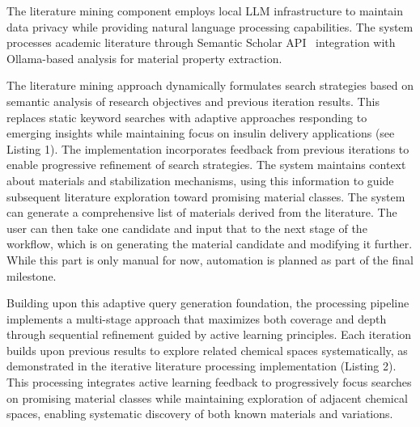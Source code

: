 \documentclass[]{fairmeta}
\begin{document}
The literature mining component employs local LLM infrastructure to maintain data privacy while providing natural language processing capabilities. The system processes academic literature through Semantic Scholar API~\cite{lo2020s2orc} integration with Ollama-based analysis for material property extraction.

The literature mining approach dynamically formulates search strategies based on semantic analysis of research objectives and previous iteration results. This replaces static keyword searches with adaptive approaches responding to emerging insights while maintaining focus on insulin delivery applications (see Listing 1). The implementation incorporates feedback from previous iterations to enable progressive refinement of search strategies. The system maintains context about materials and stabilization mechanisms, using this information to guide subsequent literature exploration toward promising material classes. The system can generate a comprehensive list of materials derived from the literature. The user can then take one candidate and input that to the next stage of the workflow, which is on generating the material candidate and modifying it further. While this part is only manual for now, automation is planned as part of the final milestone.

Building upon this adaptive query generation foundation, the processing pipeline implements a multi-stage approach that maximizes both coverage and depth through sequential refinement guided by active learning principles. Each iteration builds upon previous results to explore related chemical spaces systematically, as demonstrated in the iterative literature processing implementation (Listing 2). This processing integrates active learning feedback to progressively focus searches on promising material classes while maintaining exploration of adjacent chemical spaces, enabling systematic discovery of both known materials and variations.
\end{document}
